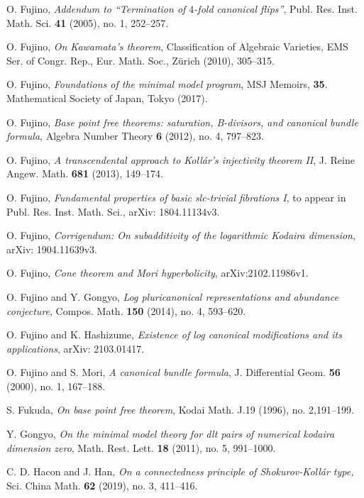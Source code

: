 \documentclass[11pt]{amsart}
\numberwithin{equation}{section}
\theoremstyle{definition}
\theoremstyle{definition}
\theoremstyle{definition}
\begin{document}
\begin{thebibliography}{99}
 O. Fujino, \textit{Addendum to “Termination of $4$-fold canonical flips”}, Publ. Res. Inst. Math. Sci. \textbf{41} (2005), no. 1, 252--257.

 O. Fujino, \textit{On Kawamata’s theorem}, Classification of Algebraic Varieties, EMS Ser. of Congr. Rep., Eur. Math. Soc., Z\"urich (2010), 305--315.

 O. Fujino, \textit{Foundations of the minimal model program}, MSJ Memoirs, \textbf{35}. Mathematical Society of Japan, Tokyo (2017).

 O. Fujino, \textit{Base point free theorems: saturation, B-divisors, and canonical bundle formula}, Algebra Number Theory \textbf{6} (2012), no. 4, 797--823.

 O. Fujino, \textit{A transcendental approach to Koll\'ar’s injectivity theorem II},  J. Reine Angew. Math. \textbf{681} (2013), 149--174.

 O. Fujino, \textit{Fundamental properties of basic slc-trivial fibrations I}, to appear in Publ. Res. Inst. Math. Sci., arXiv: 1804.11134v3.


 O. Fujino, \textit{Corrigendum: On subadditivity of the logarithmic Kodaira dimension}, arXiv: 1904.11639v3.

 O. Fujino, \textit{Cone theorem and Mori hyperbolicity},  arXiv:2102.11986v1.

 O. Fujino and Y. Gongyo, \textit{Log pluricanonical representations and abundance conjecture}, Compos. Math. \textbf{150} (2014), no. 4, 593--620.

 O. Fujino and K. Hashizume, \textit{Existence of log canonical modifications and its applications}, arXiv: 2103.01417.

 O. Fujino and S. Mori, \textit{A canonical bundle formula}, J. Differential Geom. \textbf{56} (2000), no. 1, 167--188.


 S. Fukuda, \textit{On base point free theorem}, Kodai Math. J.19 (1996), no. 2,191--199.

 Y. Gongyo, \textit{On the minimal model theory for dlt pairs of numerical kodaira dimension zero}, Math. Rest. Lett. \textbf{18} (2011), no. 5, 991--1000.

  C. D. Hacon and J. Han, \textit{On a connectedness principle of Shokurov-Koll\'ar type,} Sci. China Math. \textbf{62} (2019), no. 3, 411--416.


\end{thebibliography}
\end{document}
